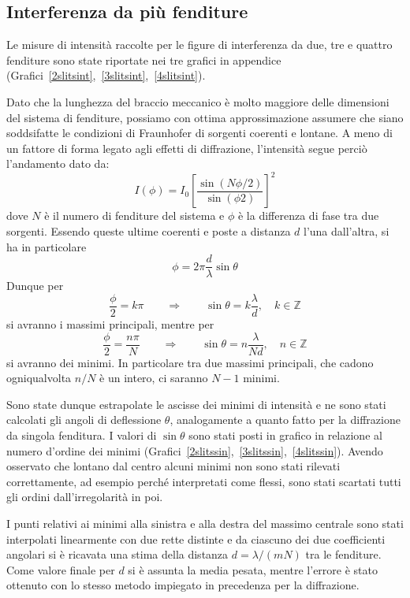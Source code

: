 \documentclass[italian,a4paper]{article}
\newcommand{\Z}{\mathbb{Z}}
\begin{document}
\subsection*{Interferenza da più fenditure}
Le misure di intensità raccolte per le figure di interferenza da due, tre e quattro fenditure sono state riportate nei tre grafici in appendice (Grafici~\ref{2slitsint},~\ref{3slitsint},~\ref{4slitsint}).

Dato che la lunghezza del braccio meccanico è molto maggiore delle dimensioni del sistema di fenditure, possiamo con ottima approssimazione assumere che siano soddsifatte le condizioni di Fraunhofer di sorgenti coerenti e lontane. A meno di un fattore di forma legato agli effetti di diffrazione, l'intensità segue perciò l'andamento dato da:
\begin{equation*} 
I(\phi)=I_0\left[\dfrac{\sin\left(N\phi/2\right)}{\sin\left(\phi2\right)}\right]^2
\end{equation*}
dove $N$ è il numero di fenditure del sistema e $\phi$ è la differenza di fase tra due sorgenti. Essendo queste ultime coerenti e poste a distanza $d$ l'una dall'altra, si ha in particolare
\begin{equation*}
\phi= 2\pi \dfrac{d}{\lambda}\sin\theta 
\end{equation*}
Dunque per
\begin{equation*}
\dfrac{\phi}{2}=k\pi\qquad\Rightarrow\qquad \sin\theta= k \dfrac{\lambda}{d},\quad k \in \Z
\end{equation*}
si avranno i massimi principali, mentre per
\begin{equation*}
\dfrac{\phi}{2}=\dfrac{n\pi}{N}\qquad\Rightarrow\qquad\sin\theta=n\dfrac{\lambda}{Nd},\quad n \in \Z
\end{equation*}
si avranno dei minimi. In particolare tra due massimi principali, che cadono ogniqualvolta $n/N$ è un intero, ci saranno $N-1$ minimi.

Sono state dunque estrapolate le ascisse dei minimi di intensità e ne sono stati calcolati gli angoli di deflessione $\theta$, analogamente a quanto fatto per la diffrazione da singola fenditura.
I valori di $\sin\theta$ sono stati posti in grafico in relazione al numero d'ordine dei minimi (Grafici~\ref{2slitssin},~\ref{3slitssin},~\ref{4slitssin}).
Avendo osservato che lontano dal centro alcuni minimi non sono stati rilevati correttamente, ad esempio perché interpretati come flessi, sono stati scartati tutti gli ordini dall'irregolarità in poi.

I punti relativi ai minimi alla sinistra e alla destra del massimo centrale sono stati interpolati linearmente con due rette distinte e da ciascuno dei due coefficienti angolari si è ricavata una stima della distanza $d=\lambda/(mN)$ tra le fenditure.
Come valore finale per $d$ si è assunta la media pesata, mentre l'errore è stato ottenuto con lo stesso metodo impiegato in precedenza per la diffrazione.
\end{document}
